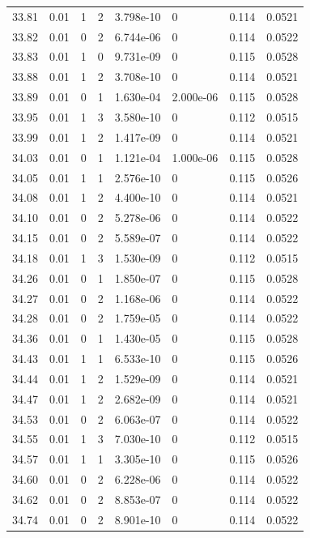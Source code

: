 \documentclass[preview]{standalone}
\begin{document}
{{{{{{{{{{{{{{\begin{tabular}{L{1.2cm}C{1.2cm} C{0.3cm}C{0.5cm} C{1.4cm}C{1.4cm} C{1.4cm}C{1.4cm}}
  33.81  &  0.01  & 1     &  2 &  3.798e-10  & 0  & 0.114 &  0.0521   \\ 
  33.82  &  0.01  & 0     &  2 &  6.744e-06  & 0  & 0.114 &  0.0522   \\ 
  33.83  &  0.01  & 1     &  0 &  9.731e-09  & 0  & 0.115 &  0.0528   \\ 
  33.88  &  0.01  & 1     &  2 &  3.708e-10  & 0  & 0.114 &  0.0521   \\ 
  33.89  &  0.01  & 0     &  1 &  1.630e-04  & 2.000e-06  & 0.115 &  0.0528   \\ 
  33.95  &  0.01  & 1     &  3 &  3.580e-10  & 0  & 0.112 &  0.0515   \\ 
  33.99  &  0.01  & 1     &  2 &  1.417e-09  & 0  & 0.114 &  0.0521   \\ 
  34.03  &  0.01  & 0     &  1 &  1.121e-04  & 1.000e-06  & 0.115 &  0.0528   \\ 
  34.05  &  0.01  & 1     &  1 &  2.576e-10  & 0  & 0.115 &  0.0526   \\ 
  34.08  &  0.01  & 1     &  2 &  4.400e-10  & 0  & 0.114 &  0.0521   \\ 
  34.10  &  0.01  & 0     &  2 &  5.278e-06  & 0  & 0.114 &  0.0522   \\ 
  34.15  &  0.01  & 0     &  2 &  5.589e-07  & 0  & 0.114 &  0.0522   \\ 
  34.18  &  0.01  & 1     &  3 &  1.530e-09  & 0  & 0.112 &  0.0515   \\ 
  34.26  &  0.01  & 0     &  1 &  1.850e-07  & 0  & 0.115 &  0.0528   \\ 
  34.27  &  0.01  & 0     &  2 &  1.168e-06  & 0  & 0.114 &  0.0522   \\ 
  34.28  &  0.01  & 0     &  2 &  1.759e-05  & 0  & 0.114 &  0.0522   \\ 
  34.36  &  0.01  & 0     &  1 &  1.430e-05  & 0  & 0.115 &  0.0528   \\ 
  34.43  &  0.01  & 1     &  1 &  6.533e-10  & 0  & 0.115 &  0.0526   \\ 
  34.44  &  0.01  & 1     &  2 &  1.529e-09  & 0  & 0.114 &  0.0521   \\ 
  34.47  &  0.01  & 1     &  2 &  2.682e-09  & 0  & 0.114 &  0.0521   \\ 
  34.53  &  0.01  & 0     &  2 &  6.063e-07  & 0  & 0.114 &  0.0522   \\ 
  34.55  &  0.01  & 1     &  3 &  7.030e-10  & 0  & 0.112 &  0.0515   \\ 
  34.57  &  0.01  & 1     &  1 &  3.305e-10  & 0  & 0.115 &  0.0526   \\ 
  34.60  &  0.01  & 0     &  2 &  6.228e-06  & 0  & 0.114 &  0.0522   \\ 
  34.62  &  0.01  & 0     &  2 &  8.853e-07  & 0  & 0.114 &  0.0522   \\ 
  34.74  &  0.01  & 0     &  2 &  8.901e-10  & 0  & 0.114 &  0.0522   \\ 
\hline 
\end{tabular} 

}}}}}}}}}}}}}}
\end{document}
